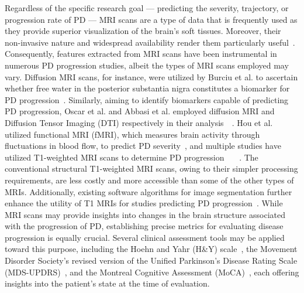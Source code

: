 Regardless of the specific research goal — predicting the severity, trajectory, or progression rate of PD — MRI scans are a type of data that is frequently used as they provide 
superior visualization of the brain's soft tissues. Moreover, their non-invasive nature and widespread availability render them particularly useful~\cite{a_jon_stoessl_wr_wayne_martin_mckeown_sossi_2011}. 
Consequently, features extracted from MRI scans have been instrumental in numerous PD progression studies, albeit the types of MRI scans employed may vary. Diffusion MRI scans, 
for instance, were utilized by Burciu et al. to ascertain whether free water in the posterior substantia nigra constitutes a biomarker for PD progression~\cite{burciu_ofori_archer_wu_pasternak_mcfarland_okun_vaillancourt_2017}. 
Similarly, aiming to identify biomarkers capable of predicting PD progression, Oscar et al. and Abbasi et al. employed diffusion MRI and Diffusion Tensor Imaging (DTI)
respectively in their analysis~\cite{oscar_pena_nogales_2019}~\cite{abbasi_seyed_mohammad_fereshtehnejad_yashar_zeighami_kevin_michel_herve_larcher_postuma_dagher_2020}. 
Hou et al. utilized functional MRI (fMRI), which measures brain activity through fluctuations in blood flow, to predict PD severity~\cite{hou_luo_yang_ou_song_wei_cao_zhao_wu_shang_et_al._2016}, and multiple studies 
have utilized T1-weighted MRI scans to determine PD progression~\cite{salmanpour_mojtaba_shamsaei_ghasem_hajianfar_hamid_soltanian_zadeh_arman_rahmim_2022}~\cite{shu2021predicting}
~\cite{wang_wu_brown_zhang_liu_han_zuo_cheng_feng_2022}. The conventional structural T1-weighted MRI scans, owing to their simpler processing requirements, are less costly and more accessible than some 
of the other types of MRIs. Additionally, existing software algorithms for image segmentation further enhance the utility of T1 MRIs for studies predicting PD progression~\cite{shu2021predicting}. 
While MRI scans may provide insights into changes in the brain structure associated with the progression of PD, establishing precise metrics for evaluating disease progression is 
equally crucial. Several clinical assessment tools may be applied toward this purpose, including the Hoehn and Yahr (H\&Y) scale~\cite{hoehn_yahr_1998}, the Movement Disorder 
Society's revised version of the Unified Parkinson's Disease Rating Scale (MDS-UPDRS)~\cite{goetz_tilley_shaftman_stebbins_fahn_martinez-martin_poewe_sampaio_stern_dodel_et_al._2008}, 
and the Montreal Cognitive Assessment (MoCA)~\cite{nasreddine_phillips_valérie_bedirian_charbonneau_whitehead_collin_cummings_chertkow_2005}, each offering insights into the patient's state 
at the time of evaluation.

